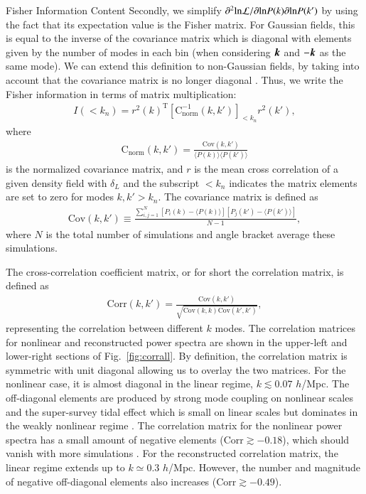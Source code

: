 \begin{section}{Fisher Information Content}
  Secondly, we simplify
  $\partial ^2 \mathrm{ln \mathcal{L}}/\partial \mathrm{ln} P(k) \partial
  \mathrm{ln} P(k')$
  by using the fact that its expectation value is the Fisher
  matrix.  For Gaussian fields, this is equal to the inverse of the
  covariance matrix which is diagonal with elements given by the
  number of modes in each bin (when considering $\boldsymbol{k}$ and $-\boldsymbol{k}$ as the same mode).  
  We can extend this definition to
  non-Gaussian fields, by taking into account that the covariance
  matrix is no longer diagonal \citep{bib:Rimes2006}.  Thus, we
  write the Fisher information in terms of matrix multiplication:
  \begin{align}
    I \left( < k_n\right) = r^2(k)^{\mathrm{T}} \left[ \mathrm{C^{-1}_{norm}} 
    ( k,k' )\right]_{<k_n} r^2(k') ,
    \label{eq:fisherformulaused}
  \end{align}
  where
  \begin{align}
    \mathrm{C_{norm}} \left( k,k' \right)=\frac{\mathrm{Cov}(k,k')}
    {\langle P(k)\rangle\langle P(k')\rangle}
  \end{align}
  is the normalized covariance matrix, and
  $r$ is the mean cross correlation of a given density field with
  $\delta_L$ and the subscript $<k_n$ indicates the matrix elements are set to
  zero for modes $k,k'>k_n$.  The covariance matrix is defined as
  \begin{align}
    \mathrm{Cov}\left(k,k'\right)\equiv \frac{\sum_{i,j=1}^{N}\left[ P_i \left( k \right) - 
    \langle P \left( k \right) \rangle \right]\left[ P_j \left( k' \right) - 
    \langle P \left( k' \right)\rangle \right]}{N-1},
  \end{align}
  where $N$ is the total number of simulations and angle bracket average these simulations.  

  The cross-correlation coefficient matrix, or for short the correlation matrix, 
  is defined as 
  \begin{align}
    \mathrm{Corr}\left(k,k'\right)=\frac{\mathrm{Cov}\left(k,k'\right)}
    {\sqrt{\mathrm{Cov}\left(k,k\right)\mathrm{Cov}\left(k',k'\right)}},
  \end{align}
  representing the correlation between different $k$ modes.  The
  correlation matrices for nonlinear and reconstructed power spectra
  are shown in the upper-left and lower-right sections of Fig.~\ref{fig:corrall}.
  By definition, the correlation matrix is symmetric with unit
  diagonal allowing us to overlay the two matrices.  For the
  nonlinear case, it is almost diagonal in the linear
  regime, $k \lesssim 0.07$ $h$/Mpc.  The off-diagonal
  elements are produced by strong mode coupling on nonlinear scales
  and the super-survey tidal effect which is small on linear scales
  but dominates in the weakly nonlinear regime
  \citep{bib:Kazuyuki2016}.  The correlation matrix for the nonlinear
  power spectra has a small amount of negative elements
  ($\mathrm{Corr} \gtrsim -0.18$), which should vanish with more
  simulations \citep{bib:Takahashi2009}.  For the reconstructed
  correlation matrix, the linear regime extends up to $k \simeq 0.3$
  $h$/Mpc.  However, the number and magnitude of negative off-diagonal elements
  also increases ($\mathrm{Corr} \gtrsim -0.49$).


\end{section}
